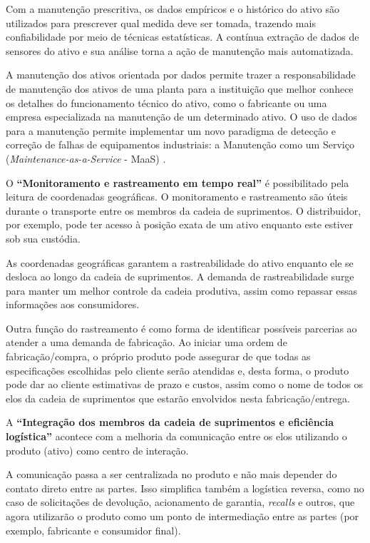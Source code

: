 Com a manutenção prescritiva, os dados empíricos e o histórico do ativo são utilizados para prescrever qual medida deve ser tomada, trazendo mais confiabilidade por meio de técnicas estatísticas. A contínua extração de dados de sensores do ativo e sua análise torna a ação de manutenção mais automatizada.

A manutenção dos ativos orientada por dados permite trazer a responsabilidade de manutenção dos ativos de uma planta para a instituição que melhor conhece os detalhes do funcionamento técnico do ativo, como o fabricante ou uma empresa especializada na manutenção de um determinado ativo. O uso de dados para a manutenção permite implementar um novo paradigma de detecção e correção de falhas de equipamentos industriais: a Manutenção como um Serviço (\textit{Maintenance-as-a-Service} - MaaS) \cite{zoll2018maas}.

O \textbf{``Monitoramento e rastreamento em tempo real''} é possibilitado pela leitura de coordenadas geográficas. O monitoramento e rastreamento são úteis durante o transporte entre os membros da cadeia de suprimentos. O distribuidor, por exemplo, pode ter acesso à posição exata de um ativo enquanto este estiver sob sua custódia.

As coordenadas geográficas garantem a rastreabilidade do ativo enquanto ele se desloca ao longo da cadeia de suprimentos. A demanda de rastreabilidade surge para manter um melhor controle da cadeia produtiva, assim como repassar essas informações aos consumidores.

Outra função do rastreamento é como forma de identificar possíveis parcerias ao atender a uma demanda de fabricação. Ao iniciar uma ordem de fabricação/compra, o próprio produto pode assegurar de que todas as especificações escolhidas pelo cliente serão atendidas e, desta forma, o produto pode dar ao cliente estimativas de prazo e custos, assim como o nome de todos os elos da cadeia de suprimentos que estarão envolvidos nesta fabricação/entrega.

A \textbf{``Integração dos membros da cadeia de suprimentos e eficiência logística''} acontece com a melhoria da comunicação entre os elos utilizando o produto (ativo) como centro de interação.

A comunicação passa a ser centralizada no produto e não mais depender do contato direto entre as partes. Isso simplifica também a logística reversa, como no caso de solicitações de devolução, acionamento de garantia, \textit{recalls} e outros, que agora utilizarão o produto como um ponto de intermediação entre as partes (por exemplo, fabricante e consumidor final).

